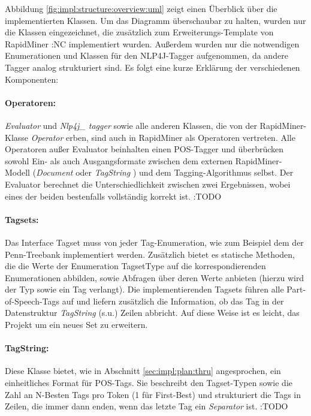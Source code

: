 Abbildung \ref{fig:impl:structure:overview:uml} zeigt einen Überblick über die implementierten Klassen. Um das Diagramm überschaubar zu halten, wurden nur die Klassen eingezeichnet, die zusätzlich zum Erweiterungs-Template von RapidMiner :NC implementiert wurden. Außerdem wurden nur die notwendigen Enumerationen und Klassen für den NLP4J-Tagger aufgenommen, da andere Tagger analog strukturiert sind. Es folgt eine kurze Erklärung der verschiedenen Komponenten:

\paragraph{Operatoren:} \textit{Evaluator} und \textit{Nlp4j\_ tagger} sowie alle anderen Klassen, die von der RapidMiner-Klasse \textit{Operator} erben, sind auch in RapidMiner als Operatoren vertreten. Alle Operatoren außer Evaluator beinhalten einen POS-Tagger und überbrücken sowohl Ein- als auch Ausgangsformate zwischen dem externen RapidMiner-Modell (\textit{Document} oder \textit{TagString} ) und dem Tagging-Algorithmus selbst. Der Evaluator berechnet die Unterschiedlichkeit zwischen zwei Ergebnissen, wobei eines der beiden bestenfalls vollständig korrekt ist. :TODO

\paragraph{Tagsets:} Das Interface Tagset muss von jeder Tag-Enumeration, wie zum Beispiel dem der Penn-Treebank implementiert werden. Zusätzlich bietet es statische Methoden, die die Werte der Enumeration TagsetType auf die korrespondierenden Enumerationen abbilden, sowie Abfragen über deren Werte anbieten (hierzu wird der Typ sowie ein Tag verlangt). Die implementierenden Tagsets führen alle Part-of-Speech-Tags auf und liefern zusätzlich die Information, ob das Tag in der Datenstruktur \textit{TagString} (s.u.) Zeilen abbricht. Auf diese Weise ist es leicht, das Projekt um ein neues Set zu erweitern.

\paragraph{TagString:} Diese Klasse bietet, wie in Abschnitt \ref{sec:impl:plan:thru} angesprochen, ein einheitliches Format für POS-Tags. Sie beschreibt den Tagset-Typen sowie die Zahl an N-Besten Tags pro Token (1 für First-Best) und strukturiert die Tags in Zeilen, die immer dann enden, wenn das letzte Tag ein \textit{Separator} ist. :TODO

